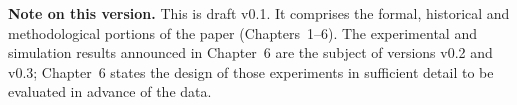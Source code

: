 \vspace{1em}
\noindent\textbf{Note on this version.} This is draft v0.1. It comprises the
formal, historical and methodological portions of the paper (Chapters~1--6).
The experimental and simulation results announced in Chapter~6 are the subject of
versions v0.2 and v0.3; Chapter~6 states the design of those experiments in
sufficient detail to be evaluated in advance of the data.
